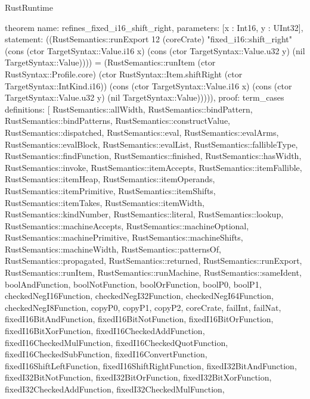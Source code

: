 \begin{lexlean}{RustRuntime}
\begin{semanticmodule}
theorem{
  name: refines_fixed_i16_shift_right,
  parameters: [x : Int16, y : UInt32],
  statement: ((RustSemantics::runExport 12 (coreCrate) "fixed_i16::shift_right" (cons (ctor TargetSyntax::Value.i16 x) (cons (ctor TargetSyntax::Value.u32 y) (nil TargetSyntax::Value)))) = (RustSemantics::runItem (ctor RustSyntax::Profile.core) (ctor RustSyntax::Item.shiftRight (ctor TargetSyntax::IntKind.i16)) (cons (ctor TargetSyntax::Value.i16 x) (cons (ctor TargetSyntax::Value.u32 y) (nil TargetSyntax::Value))))),
  proof: term_cases{
    definitions: [
      RustSemantics::allWidth,
      RustSemantics::bindPattern,
      RustSemantics::bindPatterns,
      RustSemantics::constructValue,
      RustSemantics::dispatched,
      RustSemantics::eval,
      RustSemantics::evalArms,
      RustSemantics::evalBlock,
      RustSemantics::evalList,
      RustSemantics::fallibleType,
      RustSemantics::findFunction,
      RustSemantics::finished,
      RustSemantics::hasWidth,
      RustSemantics::invoke,
      RustSemantics::itemAccepts,
      RustSemantics::itemFallible,
      RustSemantics::itemHeap,
      RustSemantics::itemOperands,
      RustSemantics::itemPrimitive,
      RustSemantics::itemShifts,
      RustSemantics::itemTakes,
      RustSemantics::itemWidth,
      RustSemantics::kindNumber,
      RustSemantics::literal,
      RustSemantics::lookup,
      RustSemantics::machineAccepts,
      RustSemantics::machineOptional,
      RustSemantics::machinePrimitive,
      RustSemantics::machineShifts,
      RustSemantics::machineWidth,
      RustSemantics::patternsOf,
      RustSemantics::propagated,
      RustSemantics::returned,
      RustSemantics::runExport,
      RustSemantics::runItem,
      RustSemantics::runMachine,
      RustSemantics::sameIdent,
      boolAndFunction,
      boolNotFunction,
      boolOrFunction,
      boolP0,
      boolP1,
      checkedNegI16Function,
      checkedNegI32Function,
      checkedNegI64Function,
      checkedNegI8Function,
      copyP0,
      copyP1,
      copyP2,
      coreCrate,
      failInt,
      failNat,
      fixedI16BitAndFunction,
      fixedI16BitNotFunction,
      fixedI16BitOrFunction,
      fixedI16BitXorFunction,
      fixedI16CheckedAddFunction,
      fixedI16CheckedMulFunction,
      fixedI16CheckedQuotFunction,
      fixedI16CheckedSubFunction,
      fixedI16ConvertFunction,
      fixedI16ShiftLeftFunction,
      fixedI16ShiftRightFunction,
      fixedI32BitAndFunction,
      fixedI32BitNotFunction,
      fixedI32BitOrFunction,
      fixedI32BitXorFunction,
      fixedI32CheckedAddFunction,
      fixedI32CheckedMulFunction,
}}
\end{semanticmodule}
\end{lexlean}
